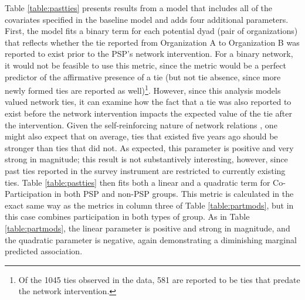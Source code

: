 \documentclass[12pt,a4paper,titlepage]{article}
\begin{document}
Table \ref{table:pastties} presents results from a model that includes all of the covariates specified in the baseline model and adds four additional parameters. First, the model fits a binary term for each potential dyad (pair of organizations) that reflects whether the tie reported from Organization A to Organization B was reported to exist prior to the PSP's network intervention. For a binary network, it would not be feasible to use this metric, since the metric would be a perfect predictor of the affirmative presence of a tie (but not tie absence, since more newly formed ties are reported as well)\footnote{Of the 1045 ties observed in the data, 581 are reported to be ties that predate the network intervention.}. However, since this analysis models valued network ties, it can examine how the fact that a tie was also reported to exist before the network intervention impacts the expected value of the tie after the intervention. Given the self-reinforcing nature of network relations \parencite{desmarais2012-a}, one might also expect that on average, ties that existed five years ago should be stronger than ties that did not. As expected, this parameter is positive and very strong in magnitude; this result is not substantively interesting, however, since past ties reported in the survey instrument are restricted to currently existing ties. Table \ref{table:pastties} then fits both a linear and a quadratic term for Co-Participation in both PSP and non-PSP groups. This metric is calculated in the exact same way as the metrics in column three of Table \ref{table:partmods}, but in this case combines participation in both types of group. As in Table \ref{table:partmods}, the linear parameter is positive and strong in magnitude, and the quadratic parameter is negative, again demonstrating a diminishing marginal predicted association.
\end{document}

